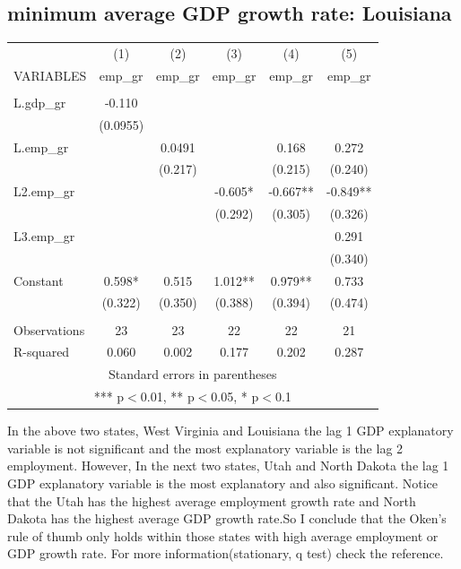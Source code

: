 \documentclass{article}
\begin{document}
\subsection{minimum average GDP growth rate: Louisiana}
\begin{center}
\resizebox{10cm}{!}
{
    \begin{tabular}{lccccc} \hline
        & (1) & (2) & (3) & (4) & (5) \\
       VARIABLES & emp\_gr & emp\_gr & emp\_gr & emp\_gr & emp\_gr \\ \hline
        &  &  &  &  &  \\
       L.gdp\_gr & -0.110 &  &  &  &  \\
        & (0.0955) &  &  &  &  \\
       L.emp\_gr &  & 0.0491 &  & 0.168 & 0.272 \\
        &  & (0.217) &  & (0.215) & (0.240) \\
       L2.emp\_gr &  &  & -0.605* & -0.667** & -0.849** \\
        &  &  & (0.292) & (0.305) & (0.326) \\
       L3.emp\_gr &  &  &  &  & 0.291 \\
        &  &  &  &  & (0.340) \\
       Constant & 0.598* & 0.515 & 1.012** & 0.979** & 0.733 \\
        & (0.322) & (0.350) & (0.388) & (0.394) & (0.474) \\
        &  &  &  &  &  \\
       Observations & 23 & 23 & 22 & 22 & 21 \\
        R-squared & 0.060 & 0.002 & 0.177 & 0.202 & 0.287 \\ \hline
       \multicolumn{6}{c}{ Standard errors in parentheses} \\
       \multicolumn{6}{c}{ *** p$<$0.01, ** p$<$0.05, * p$<$0.1} \\
\end{tabular}
}
\end{center}

In the above two states, West Virginia and Louisiana the lag 1 GDP explanatory
variable is not significant and the most explanatory variable is the lag 2 
employment. However, In the next two states, Utah and North Dakota the lag 1 GDP
explanatory variable is the most explanatory and also significant. Notice that
the Utah has the highest average employment growth rate and North Dakota has the 
highest average GDP growth rate.So I conclude that the Oken's rule of thumb only
holds within those states with high average employment or GDP growth rate. For more
information(stationary, q test) check the reference.
\end{document}
